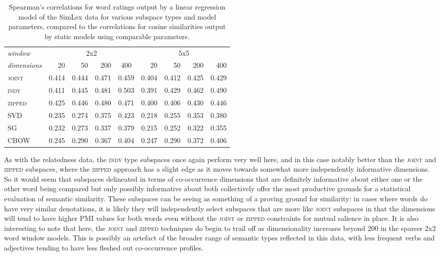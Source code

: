 \begin{table}
\centering
\begin{tabular}{lrrrr|rrrr}
\hline
\emph{window} & \multicolumn{4}{c}{2x2} & \multicolumn{4}{c}{5x5} \\
\emph{dimensions} & 20 & 50 & 200 & \multicolumn{1}{c}{400} & 20 & 50 & 200 & 400 \\
\hline
\textsc{joint} & 0.414 & 0.444 & 0.471 & 0.459 & 0.404 & 0.412 & 0.425 & 0.429 \\
\textsc{indy} & 0.411 & 0.445 & 0.481 & 0.503 & 0.391 & 0.429 & 0.462 & 0.490 \\
\textsc{zipped} & 0.425 & 0.446 & 0.480 & 0.471 & 0.400 & 0.406 & 0.430 & 0.446 \\
\textsc{SVD} & 0.235 & 0.274 & 0.375 & 0.423 & 0.218 & 0.255 & 0.353 & 0.380 \\
\textsc{SG} & 0.232 & 0.273 & 0.337 & 0.379 & 0.215 & 0.252 & 0.322 & 0.355 \\
\textsc{CBOW} & 0.245 & 0.290 & 0.367 & 0.404 & 0.247 & 0.290 & 0.372 & 0.406 \\
\hline
\end{tabular}
\caption{Spearman's correlations for word ratings output by a linear regression model of the SimLex data for various subspace types and model parameters, compared to the correlations for cosine similarities output by static models using comparable parameters.}
\label{tab:similar}
\end{table}

As with the relatedness data, the \textsc{indy} type subspaces once again perform very well here, and in this case notably better than the \textsc{joint} and \textsc{zipped} subspaces, where the \textsc{zipped} approach has a slight edge as it moves towards somewhat more independently informative dimensions.  So it would seem that subspaces delineated in terms of co-occurrence dimensions that are definitely informative about either one or the other word being compared but only possibly informative about both collectively offer the most productive grounds for a statistical evaluation of semantic similarity.  These subspaces can be seeing as something of a proving ground for similarity: in cases where words do have very similar denotations, it is likely they will independently select subspaces that are more like \textsc{joint} subspaces in that the dimensions will tend to have higher PMI values for both words even without the \textsc{joint} or \textsc{zipped} constraints for mutual salience in place.  It is also interesting to note that here, the \textsc{joint} and \textsc{zipped} techniques do begin to trail off as dimensionality increases beyond 200 in the sparser 2x2 word window models.  This is possibly an artefact of the broader range of semantic types reflected in this data, with less frequent verbs and adjectives tending to have less fleshed out co-occurrence profiles.

